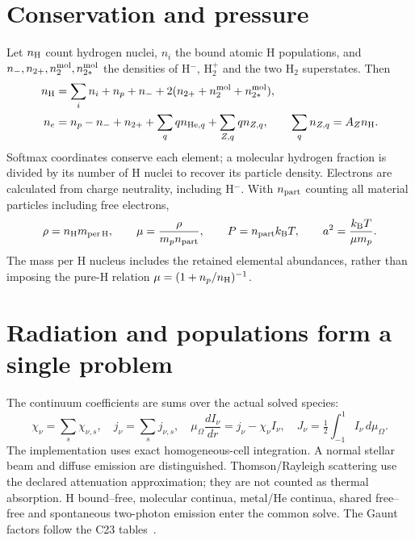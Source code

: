 \documentclass[10pt,a4paper]{article}
\newcommand{\kb}{k_{\mathrm B}}
\begin{document}
\section{Conservation and pressure}
Let $n_{\rm H}$ count hydrogen nuclei, $n_i$ the bound atomic H populations,
and $n_-,n_{2+},n_2^{\rm mol},n_{2*}^{\rm mol}$ the densities of H$^-$,
H$_2^+$ and the two H$_2$ superstates. Then
\begin{align}
 n_{\rm H}&=\sum_i n_i+n_p+n_-+2(n_{2+}+n_2^{\rm mol}+n_{2*}^{\rm mol}),
 \label{eq:nuclei}\\
 n_e&=n_p-n_-+n_{2+}+\sum_q q n_{{\rm He},q}
            +\sum_{Z,q}q n_{Z,q},\qquad
 \sum_q n_{Z,q}=A_Z n_{\rm H}. \label{eq:charge}
\end{align}
Softmax coordinates conserve each element; a molecular hydrogen fraction
is divided by its number of H nuclei to recover its particle density.
Electrons are calculated from charge neutrality, including H$^-$.
With $n_{\rm part}$ counting all material particles including free electrons,
\begin{equation}
 \rho=n_{\rm H}m_{\rm per\,H},\qquad
 \mu=\frac{\rho}{m_p n_{\rm part}},\qquad
 P=n_{\rm part}\kb T,\qquad a^2=\frac{\kb T}{\mu m_p}.
 \label{eq:pressure}
\end{equation}
The mass per H nucleus includes the retained elemental abundances, rather
than imposing the pure-H relation $\mu=(1+n_p/n_{\rm H})^{-1}$.

\section{Radiation and populations form a single problem}
The continuum coefficients are sums over the actual solved species:
\begin{equation}
 \chi_\nu=\sum_s\chi_{\nu,s},\quad j_\nu=\sum_s j_{\nu,s},\quad
 \mu_\Omega\frac{dI_\nu}{dr}=j_\nu-\chi_\nu I_\nu,\quad
 J_\nu=\tfrac12\int_{-1}^{1}I_\nu\,d\mu_\Omega.
 \label{eq:rt}
\end{equation}
The implementation uses exact homogeneous-cell integration. A normal stellar
beam and diffuse emission are distinguished. Thomson/Rayleigh scattering
use the declared attenuation approximation; they are not counted as thermal
absorption. H bound--free, molecular continua, metal/He continua, shared
free--free and spontaneous two-photon emission enter the common solve.
The Gaunt factors follow the C23 tables~\cite{gaunt1,gaunt2}.
\end{document}
